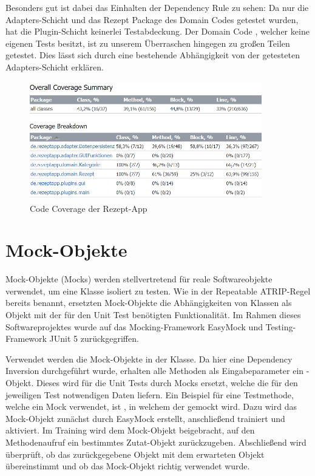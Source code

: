 Besonders gut ist dabei das Einhalten der Dependency Rule zu sehen: Da nur die Adapters-Schicht und das Rezept Package des Domain Codes getestet wurden, hat die Plugin-Schicht keinerlei Testabdeckung. Der Domain Code , welcher keine eigenen Tests besitzt, ist zu unserem Überraschen hingegen zu großen Teilen getestet. Dies lässt sich durch eine bestehende Abhängigkeit von der getesteten Adapters-Schicht erklären.

\begin{figure}[ht]
	\centering
	\includegraphics[width=0.90\textwidth]{Bilder/CodeCoverage.png} 
	\caption{Code Coverage der Rezept-App}
	\label{fig:CodeCoverageBild}
\end{figure}

\section{Mock-Objekte}
\label{Mocks}

Mock-Objekte (Mocks) werden stellvertretend für reale Softwareobjekte verwendet, um eine Klasse isoliert zu testen. Wie in der Repeatable ATRIP-Regel bereits benannt, ersetzten Mock-Objekte die Abhängigkeiten von Klassen als Objekt mit der für den Unit Test benötigten Funktionalität. Im Rahmen dieses Softwareprojektes wurde auf das Mocking-Framework EasyMock und Testing-Framework JUnit 5 zurückgegriffen.

Verwendet werden die Mock-Objekte in der \href{https://github.com/MichaelaHaag/RezeptApp/blob/main/3-Domain-Code/src/test/java/de/rezeptapp/domain/Rezept/RezeptRepositoryTest.java}{} Klasse. Da hier eine Dependency Inversion durchgeführt wurde, erhalten alle Methoden als Eingabeparameter ein -Objekt. Dieses wird für die Unit Tests durch Mocks ersetzt, welche die für den jeweiligen Test notwendigen Daten liefern. Ein Beispiel für eine Testmethode, welche ein Mock verwendet, ist , in welchem der  gemockt wird. Dazu wird das Mock-Objekt zunächst durch EasyMock erstellt, anschließend trainiert und aktiviert. Im Training wird dem Mock-Objekt beigebracht, auf den Methodenaufruf  ein bestimmtes Zutat-Objekt zurückzugeben. Abschließend wird überprüft, ob das zurückgegebene Objekt mit dem erwarteten Objekt übereinstimmt und ob das Mock-Objekt richtig verwendet wurde. 
